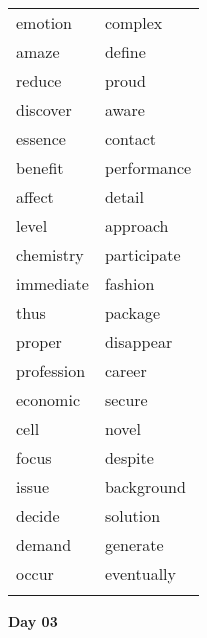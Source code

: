 \documentclass[9pt, a4paper, landscape, twocolumn]{oblivoir}
\begin{document}
    \begin{tabu}{X[2]X[2]}
        \tabucline{-} 
emotion       & complex \\
amaze       & define \\
reduce       & proud \\
discover       & aware \\
essence       & contact \\
benefit       & performance \\
affect       & detail \\
level       & approach \\
chemistry       & participate \\
immediate       & fashion \\
thus       & package \\
proper       & disappear \\
profession       & career \\
economic       & secure \\
cell       & novel \\
focus       & despite \\
issue       & background \\
decide       & solution \\
demand       & generate \\
occur       & eventually \\
        

        \tabucline{-} \\ 
    \end{tabu}

    \textbf{\Huge Day 03}\\
    
\end{document}
